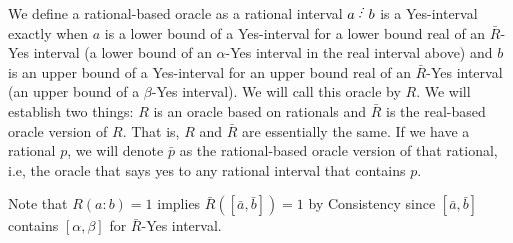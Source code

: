 \documentclass[12pt]{article}
\begin{document}
We define a rational-based oracle as a rational interval $a\lte b$ is a Yes-interval exactly when $a$ is a lower bound of a Yes-interval for a lower bound real of an $\bar{R}$-Yes interval (a lower bound of an $\alpha$-Yes interval in the real interval above) and $b$ is an upper bound of a Yes-interval for an upper bound real of an $\bar{R}$-Yes interval (an upper bound of a $\beta$-Yes interval). We will call this oracle by $R$. We will establish two things: $R$ is an oracle based on rationals and $\bar{R}$ is the real-based oracle version of $R$. That is, $R$ and $\bar{R}$ are essentially the same. If we have a rational $p$, we will denote $\bar{p}$ as the rational-based oracle version of that rational, i.e, the oracle that says yes to any rational interval that contains $p$. 

Note that $R(a:b) = 1$ implies $\bar{R}([\bar{a}, \bar{b}]) = 1$ by Consistency since $[\bar{a}, \bar{b}]$ contains $[\alpha, \beta]$ for $\bar{R}$-Yes interval. 
\end{document}
